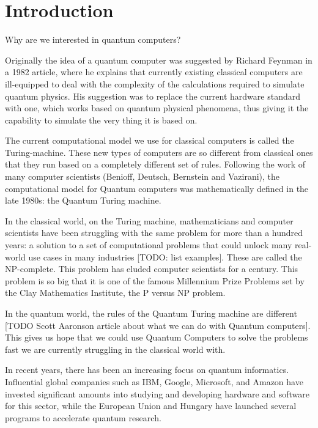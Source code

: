 \chapter{Introduction}


Why are we interested in quantum computers?

Originally the idea of a quantum computer was suggested by Richard Feynman in a 1982 article, where he explains that currently existing classical computers are ill-equipped to deal with the complexity of the calculations required to simulate quantum physics. His suggestion was to replace the current hardware standard with one, which works based on quantum physical phenomena, thus giving it the capability to simulate the very thing it is based on.

The current computational model we use for classical computers is called the Turing-machine. These new types of computers are so different from classical ones that they run based on a completely different set of rules. Following the work of many computer scientists (Benioff, Deutsch, Bernstein and Vazirani), the computational model for Quantum computers was mathematically defined in the late 1980s: the Quantum Turing machine.

In the classical world, on the Turing machine, mathematicians and computer scientists have been struggling with the same problem for more than a hundred years: a solution to a set of computational problems that could unlock many real-world use cases in many industries [TODO: list examples]. These are called the NP-complete. This problem has eluded computer scientists for a century. This problem is so big that it is one of the famous Millennium Prize Problems set by the Clay Mathematics Institute, the P versus NP problem.

In the quantum world, the rules of the Quantum Turing machine are different [TODO Scott Aaronson article about what we can do with Quantum computers]. This gives us hope that we could use Quantum Computers to solve the problems fast we are currently struggling in the classical world with.

In recent years, there has been an increasing focus on quantum informatics. Influential global companies such as IBM, Google, Microsoft, and Amazon have invested significant amounts into studying and developing hardware and software for this sector, while the European Union and Hungary have launched several programs to accelerate quantum research.
